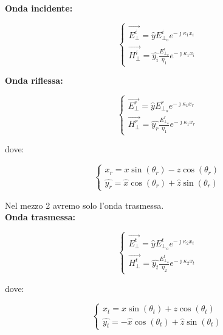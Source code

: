 \textbf{Onda incidente:} 

{\Large \begin{equation}
    \begin{cases}
        \vec{E_\perp^{i}} = \hat{y} E_{\perp_o}^{i} e^{-\jmath \kappa_1 x_i} \\ 
        \vec{H_\perp^{i}} = \hat{y_i} \frac{E_{\perp_o}^{i}}{\eta_1} e^{-\jmath \kappa_1 x_i}
    \end{cases}
\end{equation}}

\textbf{Onda riflessa:} 

{\Large \begin{equation}
    \begin{cases}
        \vec{E_\perp^{r}} = \hat{y} E_{\perp_o}^{r} e^{-\jmath \kappa_1 x_r} \\ 
        \vec{H_\perp^{r}} = \hat{y_r} \frac{E_{\perp_o}^{r}}{\eta_1} e^{-\jmath \kappa_1 x_r}
    \end{cases}
\end{equation}}


dove: 

{\Large \begin{equation}
    \begin{cases}
        x_r = x \sin(\theta_r) - z \cos(\theta_r) \\ 
        \hat{y_r} = \hat{x} \cos(\theta_r) + \hat{z} \sin(\theta_r)        
    \end{cases}
\end{equation}}

Nel mezzo 2 avremo solo l'onda trasmessa. \\ 

\textbf{Onda trasmessa:} 

{\Large \begin{equation}
    \begin{cases}
        \vec{E_\perp^{t}} = \hat{y} E_{\perp_o}^{t} e^{-\jmath \kappa_2 x_t} \\ 
        \vec{H_\perp^{t}} = \hat{y_t} \frac{E_{\perp_o}^{t}}{\eta_2} e^{-\jmath \kappa_2 x_t}
    \end{cases}
\end{equation}}

dove: 

{\Large \begin{equation}
    \begin{cases}
        x_t = x \sin(\theta_t) + z \cos(\theta_t) \\ 
        \hat{y_t} = -\hat{x} \cos(\theta_t) + \hat{z} \sin(\theta_t)        
    \end{cases}
\end{equation}}


